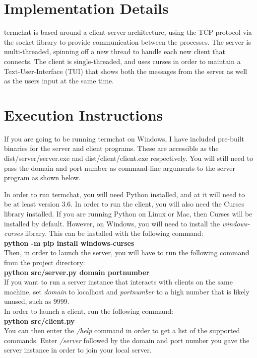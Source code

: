 \documentclass{article}
\begin{document}
    \section{Implementation Details}
    termchat is based around a client-server architecture, using the TCP
    protocol via the socket library to provide communication between the
    processes. The server is multi-threaded, spinning off a new thread to handle
    each new client that connects. The client is single-threaded, and uses
    curses in order to maintain a Text-User-Interface (TUI) that shows both the
    messages from the server as well as the users input at the same time.

    \section{Execution Instructions} 
    If you are going to be running termchat on Windows, I have included
    pre-built binaries for the server and client programs. These are accessible
    as the dist/server/server.exe and dist/client/client.exe respectively. You
    will still need to pass the domain and port number as command-line arguments
    to the server program as shown below.

    In order to run termchat, you will need Python installed, and at it will
    need to be at least version 3.6. In order to run the client, you will also
    need the Curses library installed. If you are running Python on Linux or
    Mac, then Curses will be installed by default. However, on Windows, you will
    need to install the \emph{windows-curses} library. This can be installed
    with the following command:\\
    \textbf{python -m pip install windows-curses}\\
    Then, in order to launch the server, you will have to run the following
    command from the project directory:\\
    \textbf{python src/server.py domain portnumber}\\
    If you want to run a server instance that interacts with clients on the same
    machine, set \emph{domain} to localhost and \emph{portnumber} to a high
    number that is likely unused, such as 9999.\\
    In order to launch a client, run the following command:\\
    \textbf{python src/client.py}\\
    You can then enter the \emph{/help} command in order to get a list of the
    supported commands. Enter \emph{/server} followed by the domain and port
    number you gave the server instance in order to join your local server.
\end{document}
